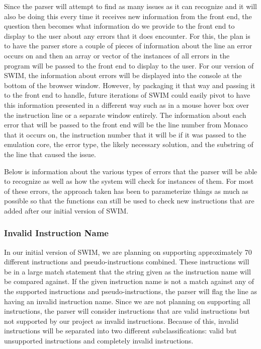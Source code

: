\documentclass[
    parskip=half,
    fontsize=12pt,
    titlepage=firstiscover,
    toc=bibliography,
    numbers=endperiod
]{scrartcl}
\begin{document}
Since the parser will attempt to find as many issues as it can recognize
and it will also be doing this every time it receives new information
from the front end, the question then becomes what information do we
provide to the front end to display to the user about any errors that it
does encounter. For this, the plan is to have the parser store a couple
of pieces of information about the line an error occurs on and then an
array or vector of the instances of all errors in the program will be
passed to the front end to display to the user. For our version of SWIM,
the information about errors will be displayed into the console at the
bottom of the browser window. However, by packaging it that way and
passing it to the front end to handle, future iterations of SWIM could
easily pivot to have this information presented in a different way such
as in a mouse hover box over the instruction line or a separate window
entirely. The information about each error that will be passed to the
front end will be the line number from Monaco that it occurs on, the
instruction number that it will be if it was passed to the emulation
core, the error type, the likely necessary solution, and the substring
of the line that caused the issue.

Below is information about the various types of errors that the parser
will be able to recognize as well as how the system will check for
instances of them. For most of these errors, the approach taken has been
to parameterize things as much as possible so that the functions can
still be used to check new instructions that are added after our initial
version of SWIM.

\subsubsection{Invalid Instruction Name}

In our initial version of SWIM, we are planning on supporting
approximately 70 different instructions and pseudo-instructions
combined. These instructions will be in a large match statement that the
string given as the instruction name will be compared against. If the
given instruction name is not a match against any of the supported
instructions and pseudo-instructions, the parser will flag the line as
having an invalid instruction name. Since we are not planning on
supporting all instructions, the parser will consider instructions that
are valid instructions but not supported by our project as invalid
instructions. Because of this, invalid instructions will be separated
into two different subclassifications: valid but unsupported
instructions and completely invalid instructions.
\end{document}

